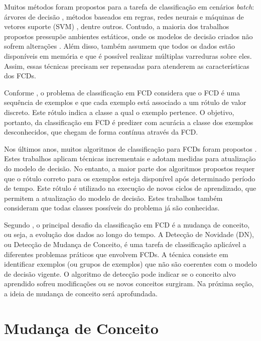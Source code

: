 \documentclass[qual, classic, a4paper]{ufbathesis}
\begin{document}
Muitos métodos foram propostos para a tarefa de classificação em cenários \textit{batch}:
árvores de decisão \cite{Breiman:Classification_Regression_Trees},
métodos baseados em regras, 
redes neurais e máquinas de vetores suporte (SVM) \cite{Vapnik1998}, 
dentre outros.
Contudo, a maioria dos trabalhos propostos pressupõe ambientes estáticos, onde os modelos de decisão criados não sofrem alterações \cite{Aggarwal:2006:DSM:1196418}.
Além disso, também assumem que todos os dados estão disponíveis em memória e que é possível realizar múltiplas varreduras sobre eles.
Assim, essas técnicas precisam ser repensadas para atenderem as características dos FCDs.

Conforme \cite{Chen:Tu}, o problema de classificação em FCD considera que o FCD é uma sequência de exemplos e que cada exemplo está associado a um rótulo de valor discreto.
Este rótulo indica a classe a qual o exemplo pertence.
O objetivo, portanto, da classificação em FCD é predizer com acurácia a classe dos exemplos desconhecidos, que chegam de forma contínua através da FCD.

Nos últimos anos, muitos algoritmos de classificação para FCDs foram propostos 
\cite{Domingos:2000:MHD:347090.347107, Bifet:2013:EDS:2480362.2480516, Wang:2003:MCD:956750.956778, Aggarwal:2004:DCD:1014052.1014110, Gama:2003:ADT:956750.956813}.
Estes trabalhos aplicam técnicas incrementais e adotam medidas para atualização do modelo de decisão.
No entanto, a maior parte dos algoritmos propostos requer que o rótulo correto para os exemplos esteja disponível após determinado período de tempo.
Este rótulo é utilizado na execução de novos ciclos de aprendizado, que permitem a atualização do modelo de decisão.
Estes trabalhos também consideram que todas classes possíveis do problema já são conhecidas. 

Segundo \cite{Aggarwal:2006:DSM:1196418}, o principal desafio da classificação em FCD é a mudança de conceito,
ou seja, a evolução dos dados ao longo do tempo.
A Detecção de Novidade (DN), ou Detecção de Mudança de Conceito, é uma tarefa de classificação aplicável a diferentes problemas práticos que envolvem FCDs.
A técnica consiste em identificar exemplos (ou grupos de exemplos) que não são coerentes com o modelo de decisão vigente.
O algoritmo de detecção pode indicar se o conceito alvo aprendido sofreu modificações ou se novos conceitos surgiram.
Na próxima seção, a ideia de mudança de conceito será aprofundada.

\section{Mudança de Conceito}
\end{document}
